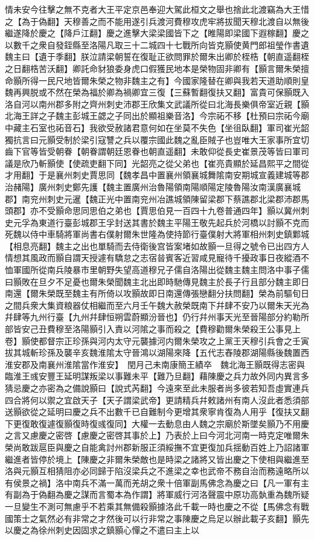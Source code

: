 情未安今往擊之無不克者大王平定京邑奉迎大駕此桓文之舉也捨此北渡竊為大王惜之【為于偽翻】天穆善之而不能用遂引兵渡河費穆攻虎牢將拔聞天穆北渡自以無後繼遂降於慶之【降戶江翻】慶之進擊大梁梁國皆下之【睢陽即梁國下遐稼翻】慶之以數千之衆自發銍縣至洛陽凡取三十二城四十七戰所向皆克顥使黄門郎祖瑩作書遺魏主曰【遺于季翻】朕泣請梁朝誓在復耻正欲問罪於爾朱出卿於桎梏【朝直遥翻桎之日翻梏苦沃翻】卿託命豺狼委身虎口假獲民地本是榮物固非卿有【顥言爾朱榮擅命顥所得一民尺地皆爾朱榮之物非魏主之有】今國家隆替在卿與我若天道助順則皇魏再興脱或不然在榮為福於卿為禍卿宜三復【三蘇暫翻復扶又翻】富貴可保顥既入洛自河以南州郡多附之齊州刺史沛郡王欣集文武議所從曰北海長樂俱帝室近親【顥北海王詳之子魏主彭城王勰之子同出於顯祖樂音洛】今宗祏不移【杜預曰宗祏今廟中藏主石室也祏音石】我欲受赦諸君意何如在坐莫不失色【坐徂臥翻】軍司崔光韶獨抗言曰元顥受制於梁引寇讐之兵以覆宗國此魏之亂臣賊子也豈唯大王家事所宜切齒下官等皆受朝眷【朝眷謂朝廷恩眷也朝直遥翻】未敢仰從長史崔景茂等皆曰軍司議是欣乃斬顥使【使疏吏翻下同】光韶亮之從父弟也【崔亮貴顯於延昌熙平之間從才用翻】于是襄州刺史賈思同【魏孝昌中置襄州領襄城舞隂南安期城宣義建城等郡治赭陽】廣州刺史鄭先護【魏主置廣州治魯陽領南陽順陽定陵魯陽汝南漢廣襄城郡】南兖州刺史元暹【魏正光中置南兖州冶譙城領陳留梁郡下蔡譙郡北梁郡沛郡馬頭郡】亦不受顥命思同思伯之弟也【賈思伯見一百四十九卷普通四年】顥以冀州刺史元孚為東道行臺彭城郡王孚封送其書於魏主平陽王敬先起兵於河橋以討顥不克而死魏以侍中車騎將軍尚書右僕射爾朱世隆為使持節行臺僕射大將軍相州刺史鎮鄴城【相息亮翻】魏主之出也單騎而去侍衛後宫皆案堵如故顥一旦得之號令已出四方人情想其風政而顥自謂天授遽有驕怠之志宿㫺賓客近習咸見寵待千擾政事日夜縱酒不恤軍國所從南兵陵暴市里朝野失望高道穆兄子儒自洛陽出從魏主魏主問洛中事子儒曰顥敗在旦夕不足憂也爾朱榮聞魏主北出即時馳傳見魏主於長子行且部分魏主即日南還【爾朱榮既至魏主有所倚以攻顥故即日南還傳張戀翻分扶問翻】榮為前驅旬日之間兵衆大集資粮器仗相繼而至六月壬午魏大赦榮既南下幷肆不安乃以爾朱天光為幷肆等九州行臺【九州幷肆恒朔雲蔚顯汾晉也】仍行幷州事天光至晉陽部分約勒所部皆安己丑費穆至洛陽顥引入責以河隂之事而殺之【費穆勸爾朱榮殺王公事見上卷】顥使都督宗正珍孫與河内太守元襲據河内爾朱榮攻之上黨王天穆引兵會之壬寅拔其城斬珍孫及襲辛亥魏淮隂太守晉鴻以湖陽來降【五代志舂陵郡湖陽縣後魏置西淮安郡及南襄州淮隂當作淮安】　閏月己未南康簡王績卒　魏北海王顥既得志密與臨淮王彧安豐王延明謀叛梁以事難未平【難乃旦翻】藉陳慶之兵力故外同内異言多猜忌慶之亦密為之備說顥曰【說式芮翻】今遠來至此未服者尚多彼若知吾虛實連兵四合將何以禦之宜啟天子【天子謂梁武帝】更請精兵幷敕諸州有南人沒此者悉須部送顥欲從之延明曰慶之兵不出數千已自難制今更增其衆寧肯復為人用乎【復扶又翻下更復敢復遽復顥復時復彧復同】大權一去動息由人魏之宗廟於斯墜矣顥乃不用慶之言又慮慶之密啓【慮慶之密啓其事於上】乃表於上曰今河北河南一時克定唯爾朱榮尚敢跋扈臣與慶之自能禽討州郡新服正須綏撫不宜更復加兵揺動百姓上乃詔諸軍繼進者皆停於境上【陳慶之非爾朱榮敵也是時梁之諸將又皆出慶之下使相與繼進至洛與元顥互相猜阻亦必同歸于陷沒梁兵之不進梁之幸也武帝不務自治而務遠略所以有侯景之禍】洛中南兵不滿一萬而羌胡之衆十倍軍副馬佛念為慶之曰【凡一軍有主有副為于偽翻為慶之謀而言蜀本為作謂】將軍威行河洛聲震中原功高埶重為魏所疑一旦變生不測可無慮乎不若乘其無備殺顥據洛此千載一時也慶之不從【馬佛念有戰國策士之氣然必有非常之才然後可以行非常之事陳慶之烏足以辦此載子亥翻】顥先以慶之為徐州刺史因固求之鎮顥心憚之不遣曰主上以